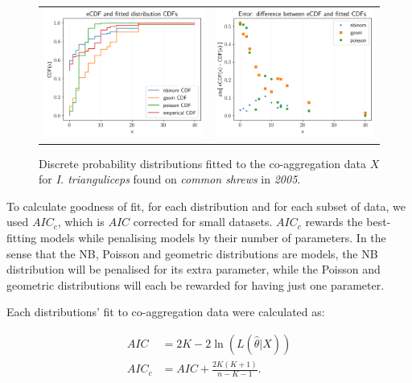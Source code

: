 \documentclass[hidelinks]{article}
\begin{document}
\begin{figure}[]
	\begin{mdframed}[backgroundcolor=grey250,rightline=false,leftline=false,topline=false]
	\centering
	\begin{tabular}{ll}
	\includegraphics[width=.48\linewidth,valign=m]{CDF_compare_2005_I.trianguliceps_SA} & \includegraphics[width=.48\linewidth,valign=m]{CDF_errors_2005_I.trianguliceps_SA}
	\end{tabular}
		\caption{Discrete probability distributions fitted to the co-aggregation data $ X $ for \textit{I. trianguliceps} found on \textit{common shrews} in \textit{2005}.}
	\label{fig:CDF_2005_itrianguliceps_SA}
	\end{mdframed}
\end{figure}

To calculate goodness of fit, for each distribution and for each subset of data, we used $ AIC_c $, which is $ AIC $ corrected for small datasets. $ AIC_c $ rewards the best-fitting models while penalising models by their number of parameters. In the sense that the NB, Poisson and geometric distributions are models, the NB distribution will be penalised for its extra parameter, while the Poisson and geometric distributions will each be rewarded for having just one parameter. 

Each distributions' fit to co-aggregation data were calculated as:

\begin{align} \label{AIC}
    AIC &= 2K - 2\ln(L(\hat \theta | X)) \nonumber \\
    AIC_c &= AIC + \frac{2K(K+1)}{n-K-1}.
\end{align}
\end{document}
